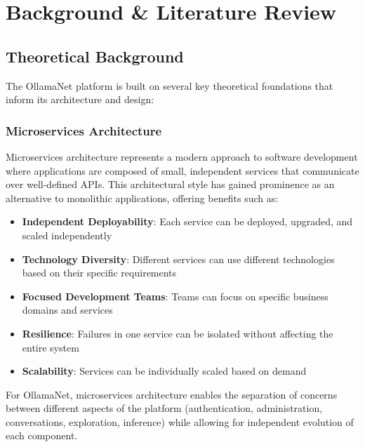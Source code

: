 \def\chapdir{./Chapter02}

\chapter{Background \& Literature Review} \label{ch:background}

\section{Theoretical Background}

The OllamaNet platform is built on several key theoretical foundations that inform its architecture and design:

\subsection{Microservices Architecture}

Microservices architecture represents a modern approach to software development where applications are composed of small, independent services that communicate over well-defined APIs. This architectural style has gained prominence as an alternative to monolithic applications, offering benefits such as:

\begin{itemize}
    \item \textbf{Independent Deployability}: Each service can be deployed, upgraded, and scaled independently
    \item \textbf{Technology Diversity}: Different services can use different technologies based on their specific requirements
    \item \textbf{Focused Development Teams}: Teams can focus on specific business domains and services
    \item \textbf{Resilience}: Failures in one service can be isolated without affecting the entire system
    \item \textbf{Scalability}: Services can be individually scaled based on demand
\end{itemize}

For OllamaNet, microservices architecture enables the separation of concerns between different aspects of the platform (authentication, administration, conversations, exploration, inference) while allowing for independent evolution of each component.


